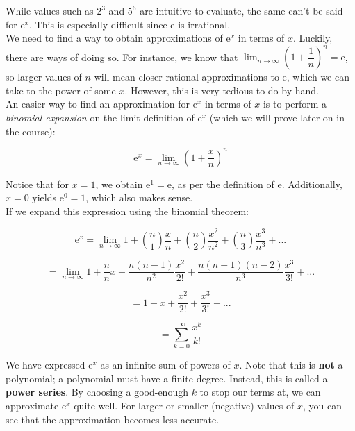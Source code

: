 \documentclass[12pt, a4paper, titlepage, twoside]{article}
\newcommand*{\e}{\textrm{e}}
\begin{document}
	\begin{fr}[Expressing \boldmath $\e^x$ as a power series]
		While values such as $2^3$ and $5^6$ are intuitive to evaluate, the same can't be said for $\e^x$. This is especially
		difficult since $\e$ is irrational.\\
	
		We need to find a way to obtain approximations of $\e^x$ in terms of $x$. Luckily, there are ways of doing so. For instance,
		we know that $\displaystyle \lim_{n \to \infty} \left(1+\dfrac{1}{n}\right)^n = \e$, so larger values of $n$ will mean closer rational
		approximations to $\e$, which we can take to the power of some $x$. However, this is very tedious to do by hand.\\
		
		An easier way to find an approximation for $\e^x$ in terms of $x$ is to perform a \textit{binomial expansion} on the limit
		definition of $\e^x$ (which we will prove later on in the course):
		
		$$\e^x = \lim_{n \to \infty} \left(1+\dfrac{x}{n}\right)^n$$
		
		\hfill
		
		Notice that for $x=1$, we obtain $\e^1 = \e$, as per the definition of $\e$. Additionally, $x=0$ yields $\e^0 = 1$, which also makes
		sense.\\
		
		If we expand this expression using the binomial theorem:
		
		$$\e^x = \lim_{n \to \infty} 1 + {n \choose 1} \dfrac{x}{n} + {n \choose 2} \dfrac{x^2}{n^2} + {n \choose 3} \dfrac{x^3}{n^3} + ...$$
		
		$$= \lim_{n \to \infty} 1 + \dfrac{n}{n} x + \dfrac{n(n-1)}{n^2} \dfrac{x^2}{2!} + \dfrac{n(n-1)(n-2)}{n^3} \dfrac{x^3}{3!} + ...$$
		
		$$= 1 + x + \dfrac{x^2}{2!} + \dfrac{x^3}{3!} + ...$$
		
		$$= \sum_{k=0}^{\infty} \dfrac{x^k}{k!}$$
		
		\hfill
		
		We have expressed $\e^x$ as an infinite sum of powers of $x$. Note that this is \textbf{not} a polynomial; a polynomial must have a 
		finite degree. Instead, this is called a \textbf{power series}. By choosing a good-enough $k$ to stop our terms 
		at, we can approximate $\e^x$ quite well. For larger or smaller (negative) values of $x$, you can see that the approximation becomes 
		less accurate.
	\end{fr}
	
\end{document}
